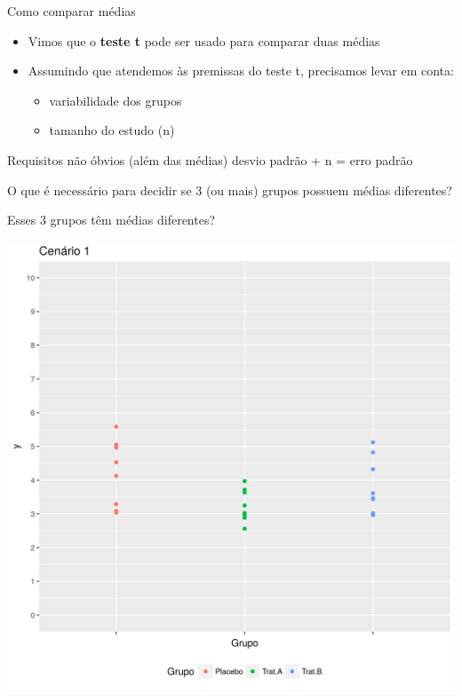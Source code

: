 \documentclass{beamer}
\begin{document}
\begin{frame}[label=requisito]{Como comparar médias}
  \begin{itemize}
  \item Vimos que o {\bf teste t} pode ser usado para comparar duas médias
  \item Assumindo que atendemos às premissas do teste t, precisamos levar em conta:
    \begin{itemize}
    \item variabilidade dos grupos
    \item tamanho do estudo (n)
    \end{itemize}
  \end{itemize}
  \begin{block}{Requisitos não óbvios (além das médias)}
    desvio padrão + n = erro padrão
  \end{block}
\end{frame}

\begin{frame}
  \begin{block}{}
    O que é necessário para decidir se 3 (ou mais) grupos possuem médias diferentes?
  \end{block}
\end{frame}

\begin{frame}{Esses 3 grupos têm médias diferentes?}
  \begin{center}
    \includegraphics[height=.9\textheight]{Topicos_adv/cenario1}
  \end{center}
\end{frame}
\end{document}
